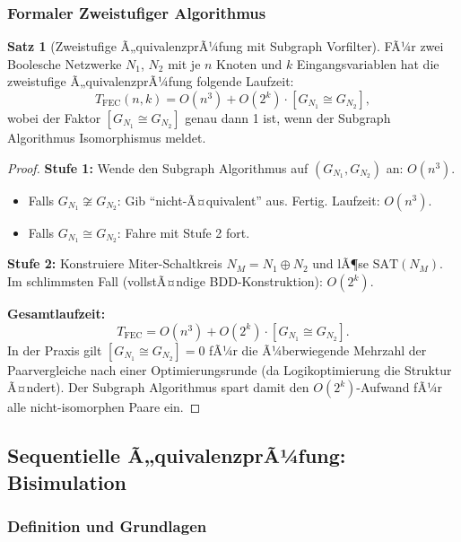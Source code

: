 ﻿\documentclass[a4paper,12pt]{article}
\theoremstyle{definition}
\newtheorem{satz}{Satz}
\begin{document}
\subsubsection{Formaler Zweistufiger Algorithmus}

\begin{satz}[Zweistufige Ã„quivalenzprÃ¼fung mit Subgraph Vorfilter]\label{satz:zweistufen}
  FÃ¼r zwei Boolesche Netzwerke $N_1$, $N_2$ mit je $n$ Knoten und $k$ Eingangsvariablen
  hat die zweistufige Ã„quivalenzprÃ¼\-fung folgende Laufzeit:
  \[
    T_{\text{FEC}}(n, k) = O(n^3) + O(2^k) \cdot [G_{N_1} \cong G_{N_2}],
  \]
  wobei der Faktor $[G_{N_1} \cong G_{N_2}]$ genau dann 1 ist, wenn der Subgraph
  Algorithmus Isomorphismus meldet.
\end{satz}

\begin{proof}
  \textbf{Stufe 1:} Wende den Subgraph Algorithmus auf $(G_{N_1}, G_{N_2})$ an: $O(n^3)$.
  \begin{itemize}
    \item Falls $G_{N_1} \not\cong G_{N_2}$: Gib ``nicht-Ã¤quivalent'' aus. Fertig.
          Laufzeit: $O(n^3)$.
    \item Falls $G_{N_1} \cong G_{N_2}$: Fahre mit Stufe 2 fort.
  \end{itemize}

  \textbf{Stufe 2:} Konstruiere Miter-Schaltkreis $N_M = N_1 \oplus N_2$ und lÃ¶se
  $\text{SAT}(N_M)$. Im schlimmsten Fall (vollstÃ¤ndige BDD-Konstruktion): $O(2^k)$.

  \textbf{Gesamtlaufzeit:}
  \[
    T_{\text{FEC}} = O(n^3) + O(2^k) \cdot [G_{N_1} \cong G_{N_2}].
  \]
  In der Praxis gilt $[G_{N_1} \cong G_{N_2}] = 0$ fÃ¼r die Ã¼berwiegende Mehrzahl der
  Paarvergleiche nach einer Optimierungsrunde (da Logikoptimierung die Struktur Ã¤ndert).
  Der Subgraph Algorithmus spart damit den $O(2^k)$-Aufwand fÃ¼r alle nicht-isomorphen
  Paare ein.
\end{proof}

\subsection{Sequentielle Ã„quivalenzprÃ¼fung: Bisimulation}

\subsubsection{Definition und Grundlagen}
\end{document}
